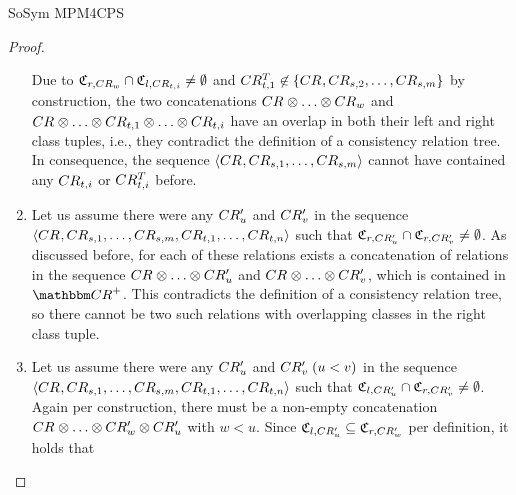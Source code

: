 \begin{copiedFrom}{SoSym MPM4CPS}
\begin{proof}
\begin{enumerate}
    Due to $\mathfrak{C}_{r,CR_{w}} \cap \mathfrak{C}_{l,CR_{t,i}} \neq \emptyset$ and  $CR^T_{t,1} \not\in \{ CR_{}, CR_{s,2}, \dots, CR_{s,m} \}$ by construction, the two concatenations $\consistencyrelation{CR}{} \concat \dots \concat \consistencyrelation{CR}{w}$ and $\consistencyrelation{CR}{} \concat \dots \concat \consistencyrelation{CR}{t,1} \concat \dots \concat \consistencyrelation{CR}{t,i}$ have an overlap in both their left and right class tuples, i.e., they contradict the definition of a consistency relation tree.
    In consequence, the sequence $\langle CR_{}, CR_{s,1}, \dots, CR_{s,m} \rangle$ cannot have contained any $CR_{t,i}$ or $CR^T_{t,i}$ before.
        \item 
    Let us assume there were any $CR'_{u}$ and $CR'_{v}$ in the sequence $\langle CR_{}, CR_{s,1}, \dots, CR_{s,m}, CR_{t,1}, \dots, CR_{t,n} \rangle$ such that $\mathfrak{C}_{r,CR'_{u}} \cap \mathfrak{C}_{r,CR'_{v}} \neq \emptyset$.
    As discussed before, for each of these relations exists a concatenation of relations in the sequence $\consistencyrelation{CR}{} \concat \dots \concat \consistencyrelation{CR'}{u}$ and $\consistencyrelation{CR}{} \concat \dots \concat \consistencyrelation{CR'}{v}$, which is contained in $\transitiveclosure{\consistencyrelationset{CR}}$.
    This contradicts the definition of a consistency relation tree, so there cannot be two such relations with overlapping classes in the right class tuple.
        \item
    Let us assume there were any $CR'_{u}$ and $CR'_{v}\; (u < v)$ in the sequence $\langle CR_{}, CR_{s,1}, \dots, CR_{s,m}, CR_{t,1}, \dots, CR_{t,n} \rangle$ such that $\mathfrak{C}_{l,CR'_{u}} \cap \mathfrak{C}_{r,CR'_{v}} \neq \emptyset$.
    Again per construction, there must be a non-empty concatenation $\consistencyrelation{CR}{} \concat \dots \concat \consistencyrelation{CR'}{w} \concat \consistencyrelation{CR'}{u}$ with $w < u$. Since $\mathfrak{C}_{l,CR'_{u}} \subseteq \mathfrak{C}_{r,CR'_{w}}$ per definition, it holds that

\end{enumerate}
\end{proof}
\end{copiedFrom}
